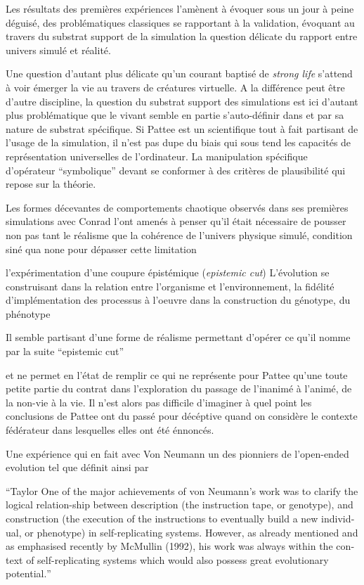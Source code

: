 
Les résultats des premières expériences l'amènent à évoquer sous un jour à peine déguisé, des problématiques classiques se rapportant à la validation, évoquant au travers du substrat support de la simulation la question délicate du rapport entre univers simulé et réalité.

Une question d'autant plus délicate qu'un courant baptisé de \textit{strong life} s'attend à voir émerger la vie au travers de créatures virtuelle. A la différence peut être d'autre discipline, la question du substrat support des simulations est ici d'autant plus problématique que le vivant semble en partie s'auto-définir dans et par sa nature de substrat spécifique. Si Pattee est un scientifique tout à fait partisant de l'usage de la simulation, il n'est pas dupe du biais qui sous tend les capacités de représentation universelles de l'ordinateur. La manipulation spécifique d'opérateur \enquote{symbolique} devant se conformer à des critères de plausibilité qui repose sur la théorie.


Les formes décevantes de comportements chaotique observés dans ses premières simulations avec Conrad l'ont amenés à penser qu'il était nécessaire de pousser non pas tant le réalisme que la cohérence de l'univers physique simulé, condition siné qua none pour dépasser cette limitation

l'expérimentation d'une coupure épistémique (\textit{epistemic cut}) L'évolution se construisant dans la relation entre l'organisme et l'environnement, la fidélité d'implémentation des processus à l'oeuvre dans la construction du génotype, du phénotype

Il semble partisant d'une forme de réalisme permettant d'opérer ce qu'il nomme par la suite \enquote{epistemic cut}

et ne permet en l'état de remplir ce qui ne représente pour Pattee qu'une toute petite partie du contrat dans l'exploration du passage de l'inanimé à l'animé, de la non-vie à la vie. Il n'est alors pas difficile d'imaginer à quel point les conclusions de Pattee ont du passé pour décéptive quand on considère le contexte fédérateur dans lesquelles elles ont été énnoncés.

Une expérience qui en fait avec Von Neumann un des pionniers de l'open-ended evolution tel que définit ainsi par \autocites{Taylor1999,Taylor2012}

\foreignquote{english}{Taylor One of the major achievements of von Neumann’s work was to clarify the logical relation-ship between description (the instruction tape, or genotype), and construction (the execution of the instructions to eventually build a new individual, or phenotype) in self-replicating systems. However, as already mentioned and as emphasised recently by McMullin (1992), his work was always within the context of self-replicating systems which would also possess great evolutionary potential.}


